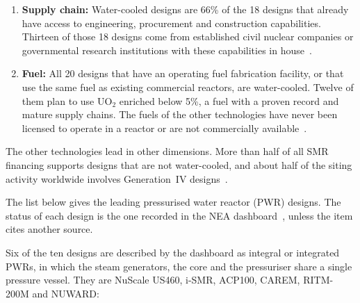 \begin{enumerate}
  \item \textbf{Supply chain:} Water-cooled designs are 66\% of the 18
        designs that already have access to engineering, procurement
        and construction capabilities. Thirteen of those 18 designs
        come from established civil nuclear companies or governmental
        research institutions with these capabilities in
        house~\cite{nea_dashboard_2025}.

  \item \textbf{Fuel:} All 20 designs that have an operating fuel
        fabrication facility, or that use the same fuel as existing
        commercial reactors, are water-cooled. Twelve of them plan to
        use UO$_2$ enriched below 5\%, a fuel with a proven record and
        mature supply chains. The fuels of the other technologies have
        never been licensed to operate in a reactor or are not
        commercially available~\cite{nea_dashboard_2025}.
\end{enumerate}

The other technologies lead in other dimensions. More than half of all
SMR financing supports designs that are not water-cooled, and about half
of the siting activity worldwide involves Generation~IV
designs~\cite{nea_dashboard_2025}.

The list below gives the leading pressurised water reactor (PWR)
designs. The status of each design is the one recorded in the NEA
dashboard~\cite{nea_dashboard_2025}, unless the item cites another source.

Six of the ten designs are described by the dashboard as integral or
integrated PWRs, in which the steam generators, the core and the
pressuriser share a single pressure vessel. They are NuScale US460,
i-SMR, ACP100, CAREM, RITM-200M and NUWARD:

